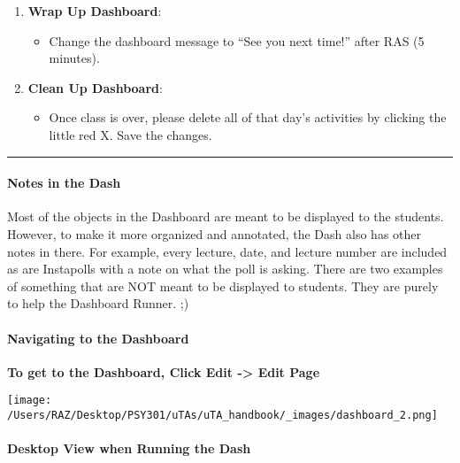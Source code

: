 \documentclass[
]{article}
\providecommand{\tightlist}{%
  \setlength{\itemsep}{0pt}\setlength{\parskip}{0pt}}
\begin{document}
\begin{enumerate}
\def\labelenumi{\arabic{enumi}.}
\tightlist
\item
  \textbf{Wrap Up Dashboard}:

  \begin{itemize}
  \tightlist
  \item
    Change the dashboard message to ``See you next time!'' after RAS (5 minutes).\\
  \end{itemize}
\item
  \textbf{Clean Up Dashboard}:

  \begin{itemize}
  \tightlist
  \item
    Once class is over, please delete all of that day's activities by clicking the little red X. Save the changes.
  \end{itemize}
\end{enumerate}

\begin{center}\rule{0.5\linewidth}{0.5pt}\end{center}

\hypertarget{notes-in-the-dash}{%
\paragraph{Notes in the Dash}\label{notes-in-the-dash}}

Most of the objects in the Dashboard are meant to be displayed to the students. However, to make it more organized and annotated, the Dash also has other notes in there. For example, every lecture, date, and lecture number are included as are Instapolls with a note on what the poll is asking. There are two examples of something that are NOT meant to be displayed to students. They are purely to help the Dashboard Runner. ;)

\hypertarget{navigating-to-the-dashboard}{%
\paragraph{Navigating to the Dashboard}\label{navigating-to-the-dashboard}}

\textbf{To get to the Dashboard, Click Edit -\textgreater{} Edit Page}

\texttt{[image: /Users/RAZ/Desktop/PSY301/uTAs/uTA\_handbook/\_images/dashboard\_2.png]}

\hypertarget{desktop-view-when-running-the-dash}{%
\paragraph{Desktop View when Running the Dash}\label{desktop-view-when-running-the-dash}}
\end{document}
